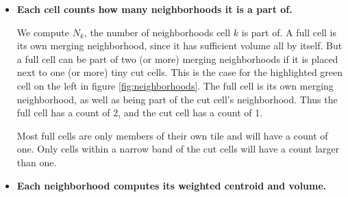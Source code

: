 \begin{itemize}

\item
{\bf Each cell counts how many neighborhoods it is a part of.}

\vspace*{.1in}
We compute $N_k$, the number of neighborhoods cell $k$ is part of.
A full cell is its own merging neighborhood, since it has sufficient
volume all by itself.
But a full cell can be part of 
two (or more)  merging neighborhoods  if it is placed next to 
one (or more)  tiny cut cells. This is the case for the highlighted green
cell on the left in figure
\ref{fig:neighborhoods}. The full cell is its own merging neighborhood, 
as well as being part of the cut cell's neighborhood. Thus the full cell has a
count of 2, and the cut cell has a count of 1.

Most full
cells are only members of their own tile and will have a count of one.
Only cells within a narrow band of the cut cells will have a count
larger than one.

\item
{\bf Each neighborhood computes its weighted centroid and volume.}


\end{itemize}
